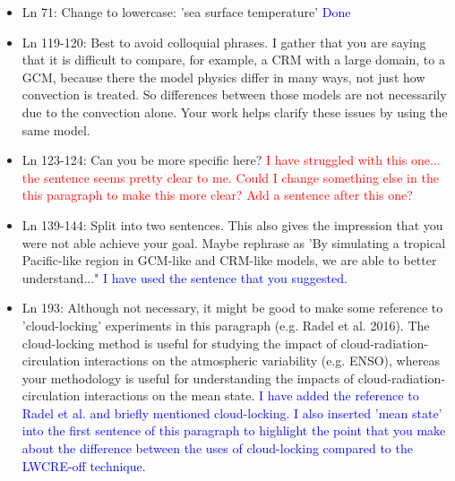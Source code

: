 \documentclass[draft]{agujournal2019}
\begin{document}
\begin{itemize}
\item Ln 71: Change to lowercase: 'sea surface temperature'  
  \textcolor{blue}{Done}
  
  \item Ln 119-120: Best to avoid colloquial phrases. I gather that you are saying that it is difficult to compare, for example, a CRM with a large domain, to a GCM, because there the model physics differ in many ways, not just how convection is treated. So differences between those models are not necessarily due to the convection alone. Your work helps clarify these issues by using the same model.
  
  \item Ln 123-124: Can you be more specific here?
  \textcolor{red}{I have struggled with this one... the sentence seems pretty clear to me.  Could I change something else in the this paragraph to 
  make this more clear?  Add a sentence after this one?}
  
  \item Ln 139-144: Split into two sentences. This also gives the impression that you were not able achieve your goal. Maybe rephrase as 'By simulating a tropical Pacific-like region in GCM-like and CRM-like models, we are able to better understand..."
  \textcolor{blue}{I have used the sentence that you suggested.}
  
  \item Ln 193: Although not necessary, it might be good to make some reference to 'cloud-locking' experiments in this paragraph (e.g. Radel et al. 2016).  The cloud-locking method is useful for studying the impact of cloud-radiation-circulation interactions on the atmospheric variability (e.g. ENSO), whereas your methodology is useful for understanding the impacts of cloud-radiation-circulation interactions on the mean state. 
  \textcolor{blue}{I have added the reference to Radel et al. and briefly mentioned cloud-locking.  I also inserted 'mean state' into the first sentence of this paragraph to highlight the point that you make about the difference between the uses of cloud-locking compared to the LWCRE-off technique.}
  

\end{itemize}
\end{document}

